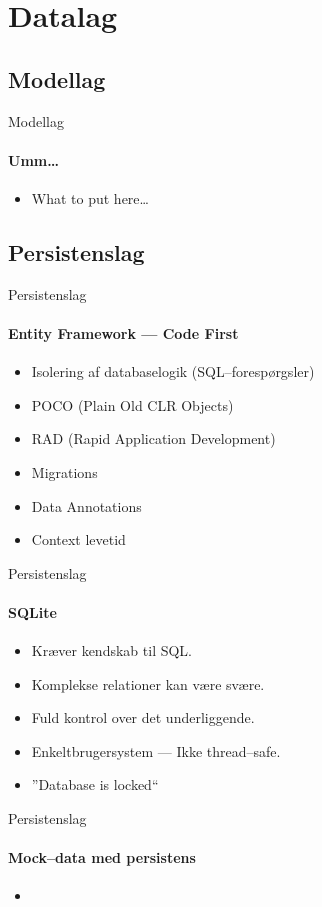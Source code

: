 \section{Datalag}



\subsection{Modellag}

\begin{frame}{Modellag}
  \framesubtitle{Umm\ldots}
  \begin{itemize}
    \item<1-> What to put here\ldots
  \end{itemize}
\end{frame}


\subsection{Persistenslag}

\begin{frame}{Persistenslag}
  \framesubtitle{Entity Framework --- Code First}
  \begin{itemize}
    \item<1-> \color{positivegreen}Isolering af databaselogik (SQL--forespørgsler)
    \item<1-> \color{positivegreen}POCO (Plain Old CLR Objects)
    \item<1-> \color{positivegreen}RAD (Rapid Application Development)
    \item<2-> \color{negativeyellow}Migrations
    \item<2-> \color{negativeyellow}Data Annotations
    \item<3-> \color{badred}Context levetid
  \end{itemize}
\end{frame}

\begin{frame}{Persistenslag}
  \framesubtitle{SQLite}
  \begin{itemize}
    \item<1-> \color{positivegreen}Kræver kendskab til SQL.
    \item<1-> \color{positivegreen}Komplekse relationer kan være svære.
    \item<1-> \color{negativeyellow}Fuld kontrol over det underliggende.
    \item<2-> \color{negativeyellow}Enkeltbrugersystem --- Ikke thread--safe.
    \item<3-> \color{badred}''Database is locked``
  \end{itemize}
\end{frame}

\begin{frame}{Persistenslag}
  \framesubtitle{Mock--data med persistens}
  \begin{itemize}
    \item<1-> 
  \end{itemize}
\end{frame}